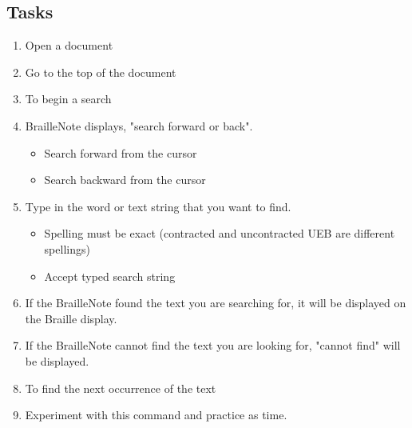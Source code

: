 \documentclass[10pt,letterpaper,twoside]{report}
\begin{document}
{\subsection{Tasks}
\begin{enumerate}
	\item Open a document
	\item Go to the top of the document 
	\item To begin a search 
	\item BrailleNote displays, "search forward or back".
	      \begin{itemize}
		      \item Search forward from the cursor 
		      \item Search backward from the cursor 
	      \end{itemize}
	\item Type in the word or text string that you want to find.
	      \begin{itemize}
		      \item Spelling must be exact (contracted and uncontracted UEB are different spellings)
		      \item Accept typed search string 
	      \end{itemize}
	\item If the BrailleNote found the text you are searching for, it will be displayed on the Braille display.
	\item If the BrailleNote cannot find the text you are looking for, "cannot find" will be displayed.
	\item To find the next occurrence of the text 
	\item Experiment with this command and practice as time.
\end{enumerate}

\clearpage
}
\end{document}
